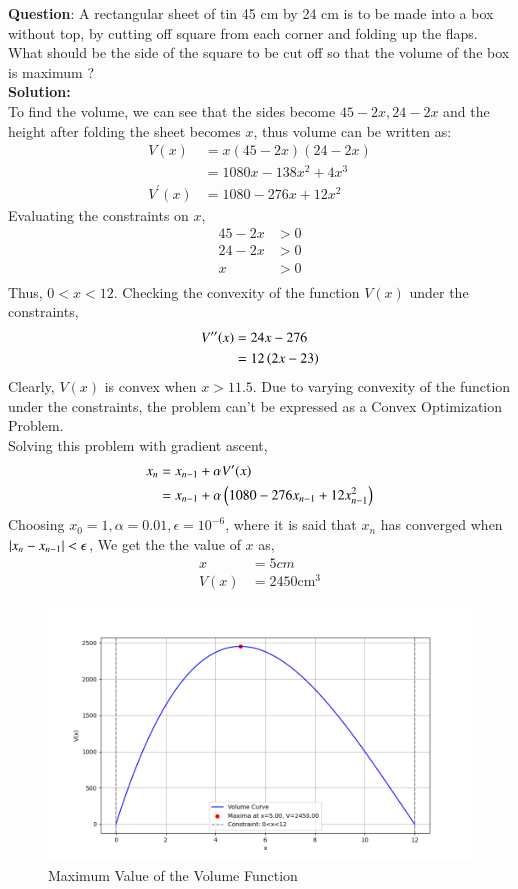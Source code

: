 \documentclass[journal]{IEEEtran}
\begin{document}
	
	\textbf{Question}:\newline
	A rectangular sheet of tin 45 cm by 24 cm is to be made into a box without top,
	by cutting off square from each corner and folding up the flaps. What should be
	the side of the square to be cut off so that the volume of the box is maximum ? \\
	\textbf{Solution: }\\
	To find the volume, we can see that the sides become $45-2x , 24-2x$ and the height after folding the sheet becomes $x$, thus volume can be written as:
	\begin{align}
		V(x) &= x(45-2x)(24-2x) \\ 
		&= 1080x - 138x^2 + 4x^3 \\		
		V^\prime(x) &= 1080 - 276x + 12x^2
	\end{align}
	Evaluating the constraints on $x$, 
	\begin{align}
		45 - 2x &> 0 \\ 24 - 2x&>0 \\ x &> 0\\
	\end{align}
	Thus, $0<x<12$. Checking the convexity of the function $V(x)$ under the constraints,
	\begin{align}
		V^{\prime\prime}(x) &= 24x - 276  \\ &= 12\left(2x-23\right)
	\end{align}
	Clearly, $V(x)$ is convex when $x>11.5$. Due to varying convexity of the function under the constraints, the problem can't be expressed as a Convex Optimization Problem. \\
	Solving this problem with gradient ascent, 
	\begin{align}
		x_n &= x_{n-1} + \alpha V^\prime(x) \\
		&= x_{n-1} + \alpha\left(1080 - 276 x_{n-1} + 12 x_{n-1}^2\right)
	\end{align}
	Choosing $x_0 = 1, \alpha = 0.01, \epsilon = 10^{-6}$, where it is said that $x_n$ has converged when $\left\vert x_n - x_{n-1}\right\vert < \epsilon$, We get the the value of $x$ as,
	\begin{align}
		x &= 5 cm  \\ 
		V(x) &= 2450 \text{cm}^3
	\end{align}
		\begin{figure}[h!]
		\centering
		\includegraphics[width=\columnwidth]{figs/fig1.png}
		\caption{Maximum Value of the Volume Function}
		\label{stemplot}
	\end{figure}
	
\end{document}

